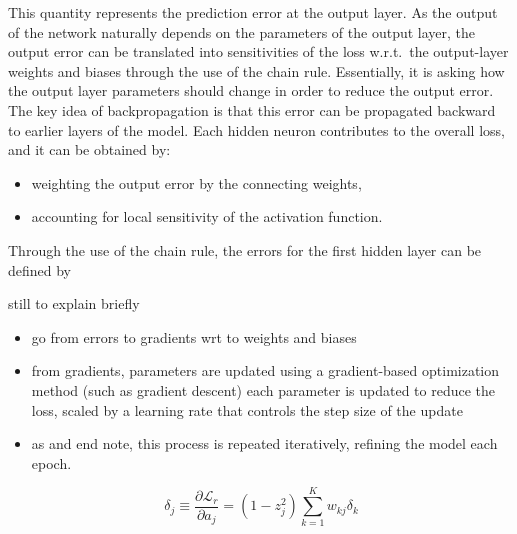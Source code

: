 This quantity represents the prediction error at the output layer. As the output of the network naturally depends on the parameters of the output layer, the output error can be translated into sensitivities of the loss w.r.t.\ the output-layer weights and biases through the use of the chain rule. Essentially, it is asking how the output layer parameters should change in order to reduce the output error. The key idea of backpropagation is that this error can be propagated backward to earlier layers of the model. Each hidden neuron contributes to the overall loss, and it can be obtained by:

\begin{itemize}
    \item weighting the output error by the connecting weights,
    \item accounting for local sensitivity of the activation function.
\end{itemize}

Through the use of the chain rule, the errors for the first hidden layer can be defined by 

still to explain briefly
\begin{itemize}
    \item go from errors to gradients wrt to weights and biases
    \item from gradients, parameters are updated using a gradient-based optimization method (such as gradient descent) each parameter is updated to reduce the loss, scaled by a learning rate that controls the step size of the update
    \item as and end note, this process is repeated iteratively, refining the model each epoch.
\end{itemize}

\begin{equation}~\label{eq:mlp_hidden_backwards}
    \delta_j \equiv \frac{\partial \mathcal{L}_r}{\partial a_j} = (1 - z_j^2) \sum_{k=1}^K w_{kj} \delta_k
\end{equation}
